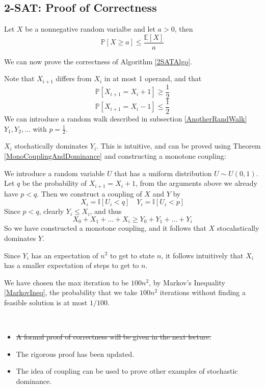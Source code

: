    \subsection{2-SAT: Proof of Correctness}
        \begin{theorem}\label{MarkovIneq}
            Let $X$ be a nonnegative random varialbe and let $a > 0$, then
            \[ \mathbb{P}[X \ge a] \le \frac{\mathbb{E}[X]}{a} \]
        \end{theorem}
        We can now prove the correctness of Algorithm \ref{2SATAlgo}.
        \begin{sketchproof}
            Note that $X_{i+1}$ differs from $X_i$ in at most 1 operand, and that
            \[ \mathbb{P}[X_{i+1} = X_i + 1] \ge \frac{1}{2} \]
            \[ \mathbb{P}[X_{i+1} = X_i - 1] \le \frac{1}{2} \]
            We can introduce a random walk described in subsection \ref{AnotherRandWalk} $Y_1, Y_2, \dots$ with $p = \frac{1}{2}$.

            $X_i$ stochatically dominates $Y_i$. This is intuitive, and can be proved using Theorem \ref{MonoCouplingAndDominance} and constructing a monotone coupling:

            We introduce a random variable $U$ that has a uniform distribution $U \sim U(0,1)$. Let $q$ be the probability of $X_{i+1} = X_i + 1$, from the arguments above we already have $p < q$. Then we construct a coupling of $X$ and $Y$ by
            \[ X_i = \mathbb{I}[U_i < q] \quad Y_i = \mathbb{I}[U_i < p] \]
            Since $p < q$, clearly $Y_i \le X_i$, and thus
            \[ X_0 + X_1 + \dots + X_i \ge Y_0 + Y_1 + \dots + Y_i \]
            So we have constructed a monotone coupling, and it follows that $X$ stocahstically dominates $Y$.
            
            Since $Y_i$ has an expectation of $n^2$ to get to state $n$, it follows intuitively that $X_i$ has a smaller expectation of steps to get to $n$.

            We have chosen the max iteration to be $100n^2$, by Markov's Inequality \ref{MarkovIneq}, the probability that we take $100n^2$ iterations without finding a feasible solution is at most $1/100$.
        \end{sketchproof}
        \begin{remark}~{}
            \begin{itemize}
                \item \sout{A formal proof of correctness will be given in the next lecture.}
                \item The rigorous proof has been updated.
                \item The idea of coupling can be used to prove other examples of stochastic dominance.
            \end{itemize}
        \end{remark}

